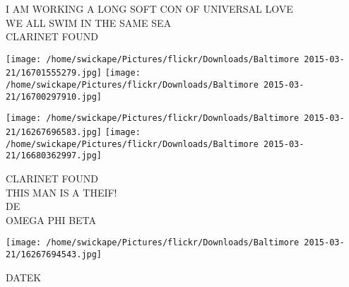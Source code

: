 \documentclass[10pt,letterpaper]{article}
\begin{document}
I AM WORKING A LONG SOFT CON OF UNIVERSAL LOVE\\
WE ALL SWIM IN THE SAME SEA\\
CLARINET FOUND
\pagebreak

\texttt{[image: /home/swickape/Pictures/flickr/Downloads/Baltimore 2015-03-21/16701555279.jpg]}
\texttt{[image: /home/swickape/Pictures/flickr/Downloads/Baltimore 2015-03-21/16700297910.jpg]}

\texttt{[image: /home/swickape/Pictures/flickr/Downloads/Baltimore 2015-03-21/16267696583.jpg]}
\texttt{[image: /home/swickape/Pictures/flickr/Downloads/Baltimore 2015-03-21/16680362997.jpg]}

CLARINET FOUND\\
THIS MAN IS A THEIF!\\
DE\\
OMEGA PHI BETA
\pagebreak

\texttt{[image: /home/swickape/Pictures/flickr/Downloads/Baltimore 2015-03-21/16267694543.jpg]}

DATEK
\pagebreak
\end{document}
